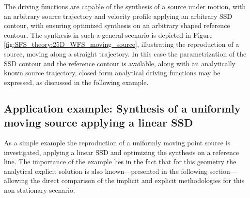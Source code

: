 The driving functions are capable of the synthesis of a source under motion, with an arbitrary source trajectory and velocity profile applying an arbitrary SSD contour, with ensuring optimized synthesis on an arbitrary shaped reference contour.
The synthesis in such a general scenario is depicted in Figure \ref{fig:SFS_theory:25D_WFS_moving_source}, illustrating the reproduction of a source, moving along a straight trajectory.
In this case the parametrization of the SSD contour and the reference contour is available, along with an analytically known source trajectory, closed form analytical driving functions may be expressed, as discussed in the following example.

\subsection*{Application example: Synthesis of a uniformly moving source applying a linear SSD}

As a simple example the reproduction of a uniformly moving point source is investigated, applying a linear SSD and optimizing the synthesis on a reference line.
The importance of the example lies in the fact that for this geometry the analytical explicit solution is also known---presented in the following section---allowing the direct comparison of the implicit and explicit methodologies for this non-stationary scenario.

